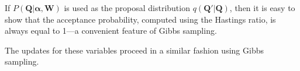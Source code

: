 If $P(\bm{Q}|\bm{\alpha}, \bm{W})$ is used as the proposal distribution $q(\bm{Q'}|\bm{Q})$, then it is easy to show that the acceptance probability, computed using the Hastings ratio, is always equal to 1---a convenient feature of Gibbs sampling.  

The updates for these variables proceed in a similar fashion using Gibbs sampling.  



